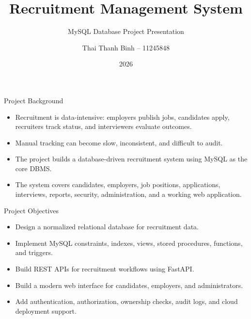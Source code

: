 \documentclass[aspectratio=169]{beamer}
\title{Recruitment Management System}
\subtitle{MySQL Database Project Presentation}
\author{Thai Thanh Binh -- 11245848}
\institute{National Economics University -- DATCOM Lab}
\date{2026}
\begin{document}
\begin{frame}
  \titlepage
\end{frame}

\begin{frame}{Project Background}
  \begin{itemize}
    \item Recruitment is data-intensive: employers publish jobs, candidates apply, recruiters track status, and interviewers evaluate outcomes.
    \item Manual tracking can become slow, inconsistent, and difficult to audit.
    \item The project builds a database-driven recruitment system using MySQL as the core DBMS.
    \item The system covers candidates, employers, job positions, applications, interviews, reports, security, administration, and a working web application.
  \end{itemize}
\end{frame}

\begin{frame}{Project Objectives}
  \begin{itemize}
    \item Design a normalized relational database for recruitment data.
    \item Implement MySQL constraints, indexes, views, stored procedures, functions, and triggers.
    \item Build REST APIs for recruitment workflows using FastAPI.
    \item Build a modern web interface for candidates, employers, and administrators.
    \item Add authentication, authorization, ownership checks, audit logs, and cloud deployment support.
  \end{itemize}
\end{frame}
\end{document}
